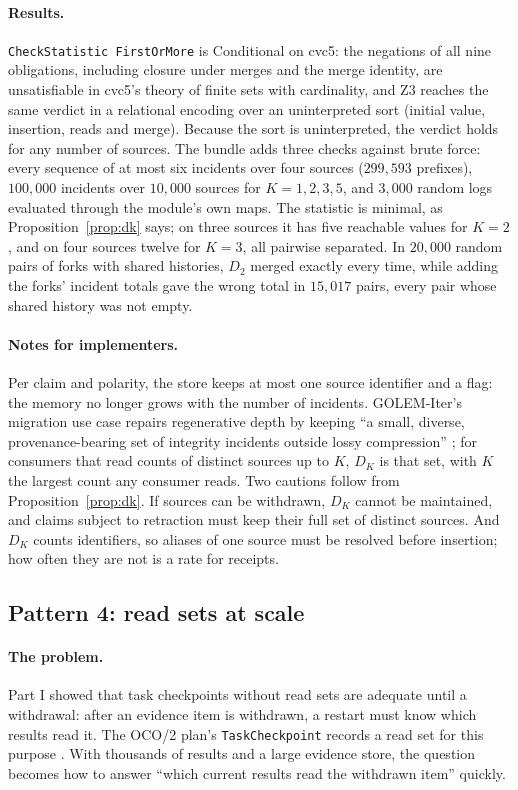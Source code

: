 \documentclass[11pt]{article}
\newcommand{\code}[1]{\texttt{#1}}
\theoremstyle{definition}
\theoremstyle{plain}
\begin{document}
\paragraph{Results.} \code{CheckStatistic FirstOrMore} is Conditional on cvc5: the negations of all
nine obligations, including closure under merges and the merge identity, are unsatisfiable in cvc5's
theory of finite sets with cardinality, and Z3 reaches the same verdict in a relational encoding over
an uninterpreted sort (initial value, insertion, reads and merge). Because the sort is
uninterpreted, the verdict holds for any number of sources. The bundle adds three checks against
brute force: every sequence of at most six incidents over four sources ($299{,}593$ prefixes),
$100{,}000$ incidents over $10{,}000$ sources for $K=1,2,3,5$, and $3{,}000$ random logs evaluated
through the module's own maps. The statistic is minimal, as Proposition~\ref{prop:dk} says; on three
sources it has five reachable values for $K=2$, and on four sources twelve for $K=3$, all pairwise
separated. In $20{,}000$ random pairs of forks with shared histories, $D_2$ merged exactly every
time, while adding the forks' incident totals gave the wrong total in $15{,}017$ pairs, every pair
whose shared history was not empty.

\paragraph{Notes for implementers.} Per claim and polarity, the store keeps at most one source
identifier and a flag: the memory no longer grows with the number of incidents. GOLEM-Iter's
migration use case repairs regenerative depth by keeping ``a small, diverse, provenance-bearing set
of integrity incidents outside lossy compression'' \cite{golemspec}; for consumers that read counts
of distinct sources up to $K$, $D_K$ is that set, with $K$ the largest count any consumer reads.
Two cautions follow from Proposition~\ref{prop:dk}. If sources can be withdrawn, $D_K$ cannot be
maintained, and claims subject to retraction must keep their full set of distinct sources. And
$D_K$ counts identifiers, so aliases of one source must be resolved before insertion; how often
they are not is a rate for receipts.

\subsection{Pattern 4: read sets at scale}\label{sec:lp4}

\paragraph{The problem.} Part I showed that task checkpoints without read sets are adequate until a
withdrawal: after an evidence item is withdrawn, a restart must know which results read it. The
OCO/2 plan's \code{TaskCheckpoint} records a read set for this purpose \cite{oco2}. With thousands
of results and a large evidence store, the question becomes how to answer ``which current results
read the withdrawn item'' quickly.
\end{document}
